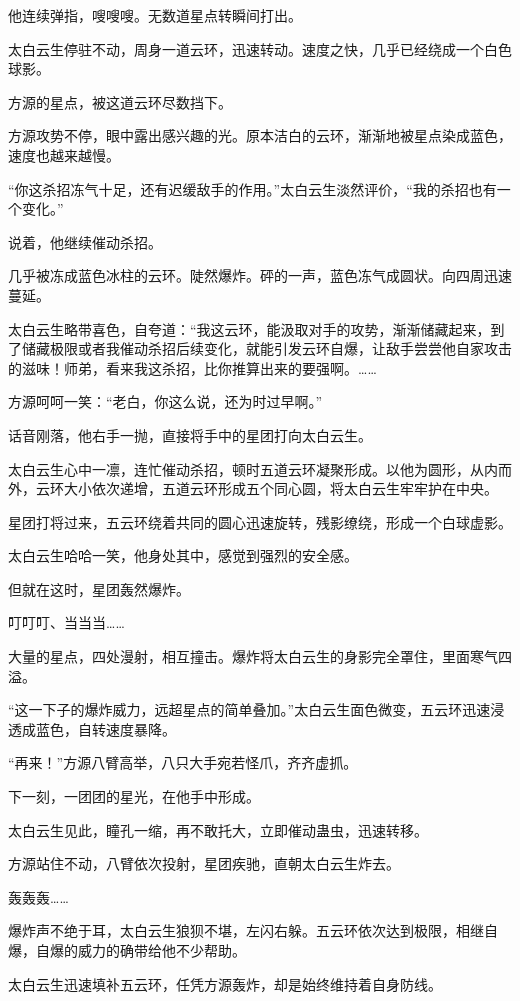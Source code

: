 \begin{this_body}
他连续弹指，嗖嗖嗖。无数道星点转瞬间打出。

太白云生停驻不动，周身一道云环，迅速转动。速度之快，几乎已经绕成一个白色球影。

方源的星点，被这道云环尽数挡下。

方源攻势不停，眼中露出感兴趣的光。原本洁白的云环，渐渐地被星点染成蓝色，速度也越来越慢。

“你这杀招冻气十足，还有迟缓敌手的作用。”太白云生淡然评价，“我的杀招也有一个变化。”

说着，他继续催动杀招。

几乎被冻成蓝色冰柱的云环。陡然爆炸。砰的一声，蓝色冻气成圆状。向四周迅速蔓延。

太白云生略带喜色，自夸道：“我这云环，能汲取对手的攻势，渐渐储藏起来，到了储藏极限或者我催动杀招后续变化，就能引发云环自爆，让敌手尝尝他自家攻击的滋味！师弟，看来我这杀招，比你推算出来的要强啊。……

方源呵呵一笑：“老白，你这么说，还为时过早啊。”

话音刚落，他右手一抛，直接将手中的星团打向太白云生。

太白云生心中一凛，连忙催动杀招，顿时五道云环凝聚形成。以他为圆形，从内而外，云环大小依次递增，五道云环形成五个同心圆，将太白云生牢牢护在中央。

星团打将过来，五云环绕着共同的圆心迅速旋转，残影缭绕，形成一个白球虚影。

太白云生哈哈一笑，他身处其中，感觉到强烈的安全感。

但就在这时，星团轰然爆炸。

叮叮叮、当当当……

大量的星点，四处漫射，相互撞击。爆炸将太白云生的身影完全罩住，里面寒气四溢。

“这一下子的爆炸威力，远超星点的简单叠加。”太白云生面色微变，五云环迅速浸透成蓝色，自转速度暴降。

“再来！”方源八臂高举，八只大手宛若怪爪，齐齐虚抓。

下一刻，一团团的星光，在他手中形成。

太白云生见此，瞳孔一缩，再不敢托大，立即催动蛊虫，迅速转移。

方源站住不动，八臂依次投射，星团疾驰，直朝太白云生炸去。

轰轰轰……

爆炸声不绝于耳，太白云生狼狈不堪，左闪右躲。五云环依次达到极限，相继自爆，自爆的威力的确带给他不少帮助。

太白云生迅速填补五云环，任凭方源轰炸，却是始终维持着自身防线。


\end{this_body}
